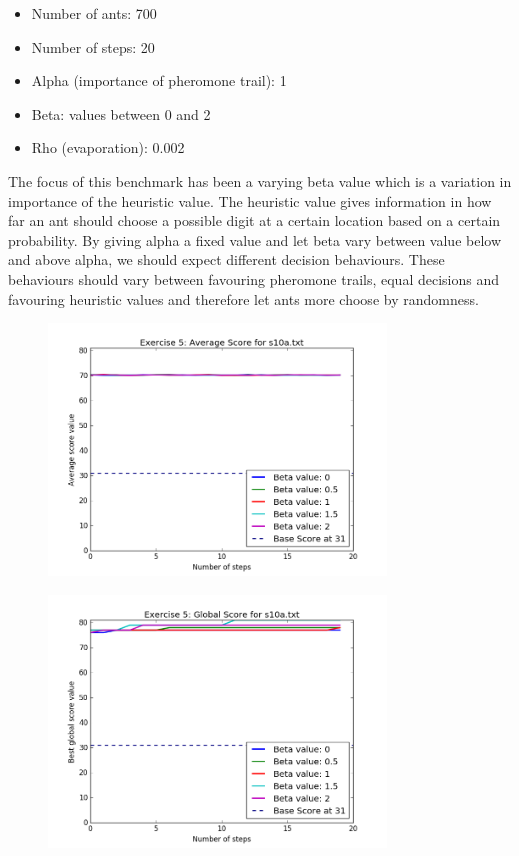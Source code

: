 \documentclass[a4paper]{article}
\begin{document}
\begin{enumerate}
\begin{enumerate}
		\begin{itemize}
		    \item Number of ants: 700
		    \item Number of steps: 20
		    \item Alpha (importance of pheromone trail): 1
		    \item Beta: values between 0 and 2 
		    \item Rho (evaporation): 0.002
		\end{itemize}
		
		The focus of this benchmark has been a varying beta value which is a variation in importance of the heuristic value. The heuristic value gives information in how far an ant should choose a possible digit at a certain location based on a certain probability. By giving alpha a fixed value and let beta vary between value below and above alpha, we should expect different decision behaviours. These behaviours should vary between favouring pheromone trails, equal decisions and favouring heuristic values and therefore let ants more choose by randomness.
		
    	\begin{figure}[H]
        	\centering
          	\includegraphics[width=0.8\textwidth]{images/average_s10a.png}
    	\end{figure}	
    	
    	\begin{figure}[H]
        	\centering
          	\includegraphics[width=0.8\textwidth]{images/best_s10a.png}
    	\end{figure}
    	

\end{enumerate}
\end{enumerate}
\end{document}
